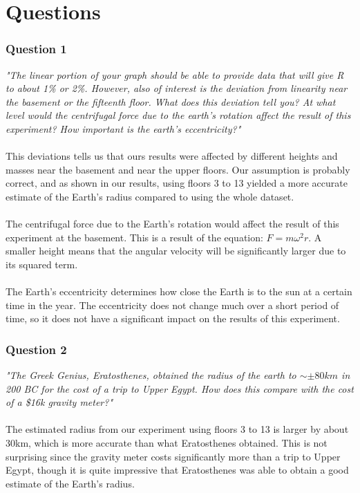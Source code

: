 \documentclass[a4paper, 11pt]{article}
\begin{document}
\section*{Questions}
\subsubsection*{Question 1}
\textit{"The linear portion of your graph should be able to provide data that will give R to about 1\% or 2\%. However, also of interest is the deviation from linearity near the basement or the fifteenth floor. What does this deviation tell you? At what level would the centrifugal force due to the earth's rotation affect the result of this experiment? How important is the earth's eccentricity?"} \\
\\
This deviations tells us that ours results were affected by different heights and masses near the basement and near the upper floors. Our assumption is probably correct, and as shown in our results, using floors 3 to 13 yielded a more accurate estimate of the Earth's radius compared to using the whole dataset. \\
\\
The centrifugal force due to the Earth's rotation would affect the result of this experiment at the basement. This is a result of the equation: $F = m\omega^2r$. A smaller height means that the angular velocity will be significantly larger due to its squared term. \\
\\
The Earth's eccentricity determines how close the Earth is to the sun at a certain time in the year. The eccentricity does not change much over a short period of time, so it does not have a significant impact on the results of this experiment.


\subsubsection*{Question 2}
\textit{"The Greek Genius, Eratosthenes, obtained the radius of the earth to $\sim\pm80km$ in 200 BC for the cost of a trip to Upper Egypt. How does this compare with the cost of a \$16k gravity meter?"} \\
\\
The estimated radius from our experiment using floors 3 to 13 is larger by about 30km, which is more accurate than what  Eratosthenes obtained. This is not surprising since the gravity meter costs significantly more than a trip to Upper Egypt, though it is quite impressive that Eratosthenes was able to obtain a good estimate of the Earth's radius.
\end{document}

